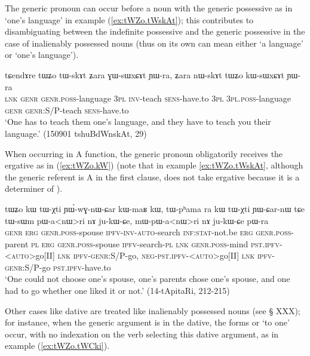 The generic pronoun can occur before a noun with the generic possessive as in   `one's language' in example (\ref{ex:tWZo.tWskAt}); this contributes to disambiguating between the indefinite possessive and the generic possessive in the case of inalienably possessed nouns (thus on its own  can mean either `a language' or `one's language').

\begin{exe}
\ex \label{ex:tWZo.tWskAt}
\gll tɕendɤre tɯʑo tɯ-skɤt ʑara ɣɯ-sɯxɕɤt ɲɯ-ra, ʑara nɯ-skɤt tɯʑo kɯ-sɯxɕɤt ɲɯ-ra \\
\textsc{lnk} \textsc{genr} \textsc{genr.poss}-language \textsc{3pl} \textsc{inv}-teach \textsc{sens}-have.to \textsc{3pl} \textsc{3pl.poss}-language \textsc{genr} \textsc{genr}:S/P-teach \textsc{sens}-have.to \\
\glt `One has to teach them one's language, and they have to teach you their language.'  (150901 tshuBdWnskAt, 29)
\end{exe} 

When occurring in A function, the generic pronoun  obligatorily receives the ergative  as in (\ref{ex:tWZo.kW}) (note that in example \ref{ex:tWZo.tWskAt}, although the generic referent is A in the first clause,  does not take ergative because it is a determiner of ). 

\begin{exe}
\ex \label{ex:tWZo.kW}
\gll tɯʑo kɯ tɯ-χti ɲɯ́-wɣ-nɯ-ɕar kɯ-maʁ kɯ,  tɯ-pʰama ra kɯ tɯ-χti ɲɯ-ɕar-nɯ tɕe tɯ-sɯm pɯ-a<nɯ>ri nɤ ju-kɯ-ɕe,
mɯ-pɯ-a<nɯ>ri nɤ ju-kɯ-ɕe pɯ-ra \\
\textsc{genr} \textsc{erg} \textsc{genr.poss}-spouse \textsc{ipfv-inv-auto}-search \textsc{inf:stat}-not.be \textsc{erg} \textsc{genr.poss}-parent \textsc{pl} \textsc{erg} \textsc{genr.poss}-spouse \textsc{ipfv}-search-\textsc{pl} \textsc{lnk} \textsc{genr.poss}-mind \textsc{pst.ipfv}-<\textsc{auto}>go[II] \textsc{lnk} \textsc{ipfv}-\textsc{genr}:S/P-go, \textsc{neg-pst.ipfv}-<\textsc{auto}>go[II] \textsc{lnk} \textsc{ipfv-genr}:S/P-go \textsc{pst.ipfv}-have.to \\
\glt `One could not choose one's spouse, one's parents chose one's spouse, and one had to go whether one liked it or not.' (14-tApitaRi, 212-215)
\end{exe} 

Other cases like dative are treated like inalienably possessed nouns (see § XXX); for instance, when the generic argument is in the dative, the forms  or  `to one' occur, with no indexation on the verb selecting this dative argument, as in example (\ref{ex:tWZo.tWCki}).

